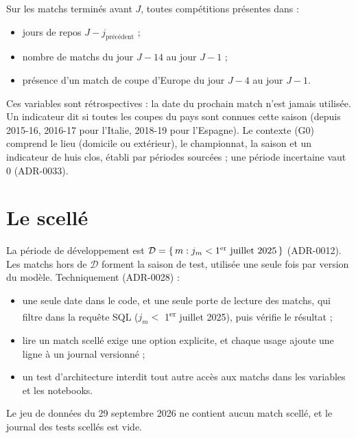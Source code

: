 Sur les matchs terminés avant \(J\), toutes compétitions présentes dans  :
\begin{itemize}
  \item jours de repos \(J - j_{\text{précédent}}\) ;
  \item nombre de matchs du jour \(J - 14\) au jour \(J - 1\) ;
  \item présence d'un match de coupe d'Europe du jour \(J - 4\) au jour \(J - 1\).
\end{itemize}
Ces variables sont rétrospectives : la date du prochain match n'est jamais utilisée. Un indicateur
dit si toutes les coupes du pays sont connues cette saison (depuis 2015-16, 2016-17 pour l'Italie,
2018-19 pour l'Espagne). Le contexte (G0) comprend le lieu (domicile ou extérieur), le championnat,
la saison et un indicateur de huis clos, établi par périodes sourcées ; une période incertaine vaut 0
(ADR-0033).

\section{Le scellé}
\label{sec:scelle}

La période de développement est \(\mathcal{D} = \{\, m : j_m < \text{1\textsuperscript{er} juillet 2025} \,\}\)
(ADR-0012). Les matchs hors de \(\mathcal{D}\) forment la saison de test, utilisée une seule fois
par version du modèle. Techniquement (ADR-0028) :
\begin{itemize}
  \item une seule date dans le code, et une seule porte de lecture des matchs, qui filtre dans la
        requête SQL (\(j_m < \) 1\textsuperscript{er} juillet 2025), puis vérifie le résultat ;
  \item lire un match scellé exige une option explicite, et chaque usage ajoute une ligne à un
        journal versionné ;
  \item un test d'architecture interdit tout autre accès aux matchs dans les variables et les
        notebooks.
\end{itemize}
Le jeu de données du 29 septembre 2026 ne contient aucun match scellé, et le journal des tests
scellés est vide.
